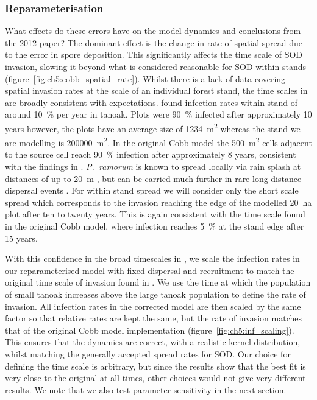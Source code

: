 \subsubsection{Reparameterisation}

What effects do these errors have on the model dynamics and conclusions from the 2012 paper? The dominant effect is the change in rate of spatial spread due to the error in spore deposition. This significantly affects the time scale of SOD invasion, slowing it beyond what is considered reasonable for SOD within stands (figure~\ref{fig:ch5:cobb_spatial_rate}). Whilst there is a lack of data covering spatial invasion rates at the scale of an individual forest stand, the time scales in \citet{cobb_ecosystem_2012} are broadly consistent with expectations. \citet{mcpherson_responses_2010} found infection rates within stand of around \SI{10}{\percent} per year in tanoak. Plots were \SI{90}{\percent} infected after approximately 10 years however, the plots have an average size of \SI{1234}{\meter\squared} whereas the stand we are modelling is \SI{200000}{\meter\squared}. In the original Cobb model the \SI{500}{\meter\squared} cells adjacent to the source cell reach \SI{90}{\percent} infection after approximately 8 years, consistent with the findings in \citet{mcpherson_responses_2010}. \textit{P.~ramorum} is known to spread locally via rain splash at distances of up to \SI{20}{\meter} \citep{davidson_transmission_2005}, but can be carried much further in rare long distance dispersal events \citep{meentemeyer_epidemiological_2011}. For within stand spread we will consider only the short scale spread which corresponds to the invasion reaching the edge of the modelled \SI{20}{\hectare} plot after ten to twenty years. This is again consistent with the time scale found in the original Cobb model, where infection reaches \SI{5}{\percent} at the stand edge after 15 years.

With this confidence in the broad timescales in \citet{cobb_ecosystem_2012}, we scale the infection rates in our reparameterised model with fixed dispersal and recruitment to match the original time scale of invasion found in \citet{cobb_ecosystem_2012}. We use the time at which the population of small tanoak increases above the large tanoak population to define the rate of invasion. All infection rates in the corrected model are then scaled by the same factor so that relative rates are kept the same, but the rate of invasion matches that of the original Cobb model implementation (figure~\ref{fig:ch5:inf_scaling}). This ensures that the dynamics are correct, with a realistic kernel distribution, whilst matching the generally accepted spread rates for SOD\@. Our choice for defining the time scale is arbitrary, but since the results show that the best fit is very close to the original at all times, other choices would not give very different results. We note that we also test parameter sensitivity in the next section.

